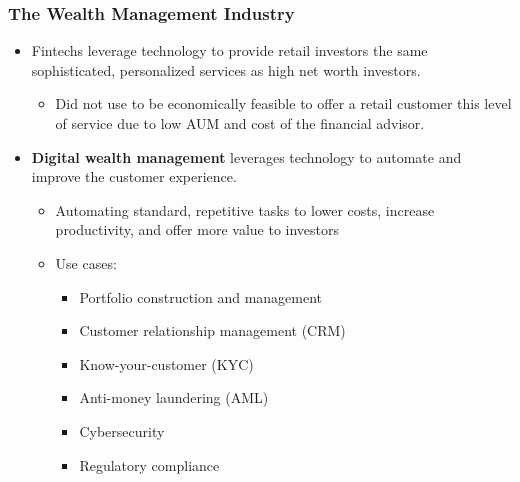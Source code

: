 
\begin{frame}
\frametitle{The Wealth Management Industry}


\vspace{-2mm}
\begin{itemize}
    \item Fintechs leverage technology to provide retail investors the same sophisticated, personalized services as high net worth investors.
    \begin{itemize}
        \item Did not use to be economically feasible to offer a retail customer this level of service due to low AUM and cost of the financial advisor.
    \end{itemize}

    \item \textbf{Digital wealth management} leverages technology to automate and improve the customer experience.
    \begin{itemize}
        \item Automating standard, repetitive tasks to lower costs, increase productivity, and offer more value to investors
        \item Use cases:
        \begin{itemize}
            \item Portfolio construction and management
            \item Customer relationship management (CRM)
            \item Know-your-customer (KYC)
            \item Anti-money laundering (AML)
            \item Cybersecurity
            \item Regulatory compliance
        \end{itemize}
    \end{itemize}
\end{itemize}



\end{frame} 




